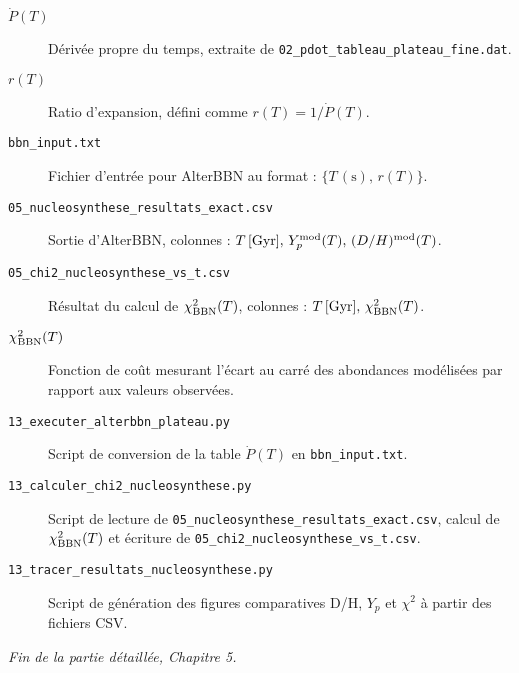 \begin{description}
  \item[\(\dot P(T)\)] Dérivée propre du temps, extraite de \texttt{02\_pdot\_tableau\_plateau\_fine.dat}.
  \item[\(r(T)\)] Ratio d’expansion, défini comme \(r(T)=1/\dot P(T)\).
  \item[\texttt{bbn\_input.txt}] Fichier d’entrée pour AlterBBN au format :
    \(\{T\,(\mathrm{s}),\,r(T)\}\).
  \item[\texttt{05\_nucleosynthese\_resultats\_exact.csv}] Sortie d’AlterBBN, colonnes :
    \(T\,[\mathrm{Gyr}],\,Y_{p}^{\rm mod}(T),\,(D/H)^{\rm mod}(T)\).
  \item[\texttt{05\_chi2\_nucleosynthese\_vs\_t.csv}] Résultat du calcul de \(\chi^{2}_{\rm BBN}(T)\),
    colonnes : \(T\,[\mathrm{Gyr}],\,\chi^{2}_{\rm BBN}(T)\).
  \item[\(\chi^{2}_{\rm BBN}(T)\)] Fonction de coût mesurant l’écart au carré des abondances modélisées
    par rapport aux valeurs observées.
  \item[\texttt{13\_executer\_alterbbn\_plateau.py}] Script de conversion de la table \(\dot P(T)\) en
    \texttt{bbn\_input.txt}.
  \item[\texttt{13\_calculer\_chi2\_nucleosynthese.py}] Script de lecture de \texttt{05\_nucleosynthese\_resultats\_exact.csv},
    calcul de \(\chi^{2}_{\rm BBN}(T)\) et écriture de \texttt{05\_chi2\_nucleosynthese\_vs\_t.csv}.
  \item[\texttt{13\_tracer\_resultats\_nucleosynthese.py}] Script de génération des figures comparatives D/H, \(Y_{p}\) et
    \(\chi^{2}\) à partir des fichiers CSV.
\end{description}

\bigskip
\noindent\emph{Fin de la partie détaillée, Chapitre 5.}

